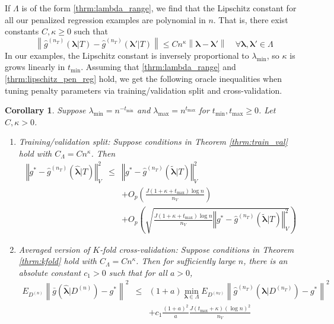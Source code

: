 \documentclass[12pt]{article}
\newtheorem{corollary}{Corollary}
\begin{document}
If $\Lambda$ is of the form \eqref{thrm:lambda_range}, we find that the Lipschitz constant for all our penalized regression examples are polynomial in $n$. That is, there exist constants $C, \kappa \ge 0$ such that
\begin{equation}
\label{thrm:lipschitz_pen_reg}
\left \| \hat{g}^{(n_T)}(\boldsymbol{\lambda}|T) - \hat{g}^{(n_T)}(\boldsymbol{\lambda}'|T) \right \| \le C n^\kappa \left \| \boldsymbol{\lambda} - \boldsymbol{\lambda}' \right \| \quad \forall \boldsymbol{\lambda}, \boldsymbol{\lambda}' \in \Lambda
\end{equation}
In our examples, the Lipschitz constant is inversely proportional to $\lambda_{\min}$, so $\kappa$ is grows linearly in $t_{\min}$. Assuming that \eqref{thrm:lambda_range} and \eqref{thrm:lipschitz_pen_reg} hold, we get the following oracle inequalities when tuning penalty parameters via training/validation split and cross-validation. 
\begin{corollary}
	 Suppose $\lambda_{\min} = n^{-t_{\min}}$ and $\lambda_{\max} = n^{t_{\max}}$ for $t_{\min}, t_{\max} \ge 0$. Let $C, \kappa  > 0$.
	 
	 \begin{enumerate}
	 	\item Training/validation split: Suppose conditions in Theorem \ref{thrm:train_val} hold with $C_\Lambda = C n^\kappa$. Then 
		\begin{eqnarray}
		\left\Vert g^* - \hat{g}^{(n_T)}( \hat{\boldsymbol{\lambda}} | T) \right\Vert _{V}^2 &\le& \left\Vert g^* - \hat{g}^{(n_T)}( \tilde{\boldsymbol{\lambda}} | T) \right \Vert^2_{V}\\
		&& + O_p \left(\frac{J (1 + \kappa + t_{\max})\log n}{n_{V}} \right) 
		\\
		&& + O_p \left(
		\sqrt{
			\frac{J (1 + \kappa + t_{\max})\log n}{n_{V}}
			\left\Vert g^* - \hat{g}^{(n_T)}( \tilde{\boldsymbol{\lambda}}| T) \right \Vert^2_{V}
		}
		\right )
		\end{eqnarray}
	 	
	 	\item Averaged version of $K$-fold cross-validation: Suppose conditions in Theorem \ref{thrm:kfold}  hold with $C_\Lambda = C n^\kappa$. Then for sufficiently large $n$, there is an absolute constant $c_1 > 0$ such that for all $a > 0$,
	 	\begin{eqnarray}
	 	E_{D^{(n)}} \left \| \bar{g} ( \hat{\boldsymbol \lambda} | {D^{(n)}} ) - g^* \right \|^2 &\le&
	 	(1+a) \min_{\boldsymbol{\lambda} \in \Lambda}  E_{D^{(n_T)}} \left \| \hat{g}^{(n_T)}(\boldsymbol \lambda | D^{(n_T)}) - g^* \right \|^2 \\
	 	&& + c_1 \frac{(1+a)^2}{a} 
	 	\frac{J (t_{\max} + \kappa) (\log n)^2}{n_V} 
	 	\end{eqnarray}
	 \end{enumerate}
\end{corollary}
\end{document}
